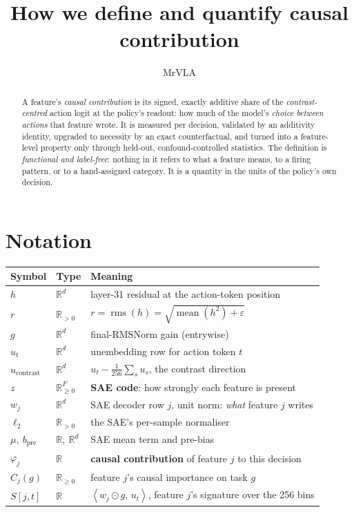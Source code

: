 \documentclass[11pt]{article}
\title{How we define and quantify causal contribution}
\author{MrVLA}
\date{}
\newcommand{\Rb}{\mathbb{R}}
\newcommand{\ip}[2]{\left\langle #1,\, #2 \right\rangle}
\newcommand{\ucon}{u_{\mathrm{contrast}}}
\newcommand{\bpre}{b_{\mathrm{pre}}}
\begin{document}
\maketitle

\begin{abstract}
\noindent
A feature's \emph{causal contribution} is its signed, exactly additive share of the
\emph{contrast-centred} action logit at the policy's readout: how much of the model's
\emph{choice between actions} that feature wrote. It is measured per decision, validated by
an additivity identity, upgraded to necessity by an exact counterfactual, and turned into a
feature-level property only through held-out, confound-controlled statistics. The definition
is \emph{functional and label-free}: nothing in it refers to what a feature means, to a firing
pattern, or to a hand-assigned category. It is a quantity in the units of the policy's own
decision.
\end{abstract}

\section{Notation}
\label{sec:notation}

\begin{center}
\begin{tabular}{@{}lll@{}}
\toprule
Symbol & Type & Meaning \\
\midrule
$h$        & $\Rb^{d}$          & layer-31 residual at the action-token position \\
$r$        & $\Rb_{>0}$         & $r=\operatorname{rms}(h)=\sqrt{\operatorname{mean}(h^{2})+\varepsilon}$ \\
$g$        & $\Rb^{d}$          & final-RMSNorm gain (entrywise) \\
$u_t$      & $\Rb^{d}$          & unembedding row for action token $t$ \\
$\ucon$    & $\Rb^{d}$          & $u_t-\tfrac{1}{256}\sum_{s}u_s$, the contrast direction \\
$z$        & $\Rb_{\ge 0}^{F}$  & \textbf{SAE code}: how strongly each feature is present \\
$w_j$      & $\Rb^{d}$          & SAE decoder row $j$, unit norm: \emph{what} feature $j$ writes \\
$\ell_2$   & $\Rb_{>0}$         & the SAE's per-sample normaliser \\
$\mu,\ \bpre$ & $\Rb,\ \Rb^{d}$ & SAE mean term and pre-bias \\
$\varphi_j$& $\Rb$              & \textbf{causal contribution} of feature $j$ to this decision \\
$C_j(g)$   & $\Rb_{\ge 0}$      & feature $j$'s causal importance on task $g$ \\
$S[j,t]$   & $\Rb$              & $\ip{w_j\odot g}{u_t}$, feature $j$'s signature over the 256 bins \\
\bottomrule
\end{tabular}
\end{center}
\end{document}
